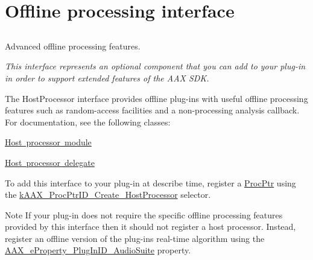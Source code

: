 \hypertarget{a00804}{}\section{Offline processing interface}
\label{a00804}


\subsection{ }
Advanced offline processing features. 

{\itshape This interface represents an optional component that you can add to your plug-\/in in order to support extended features of the A\+AX S\+DK.}

The Host\+Processor interface provides offline plug-\/ins with useful offline processing features such as random-\/access facilities and a non-\/processing analysis callback. For documentation, see the following classes\+:
\begin{DoxyItemize}
\item \mbox{\hyperlink{a01485}{Host processor module}}
\item \mbox{\hyperlink{a01701}{Host processor delegate}}
\end{DoxyItemize}

To add this interface to your plug-\/in at describe time, register a \mbox{\hyperlink{a01813_ad1a286ef7cb869e6f79423dd774ec976}{Proc\+Ptr}} using the \mbox{\hyperlink{a00401_af0682195d377392ad356fd2b00c36892a04ce687ba05b8c7c2cce0b32d868f3db}{k\+A\+A\+X\+\_\+\+Proc\+Ptr\+I\+D\+\_\+\+Create\+\_\+\+Host\+Processor}} selector.

\begin{DoxyNote}{Note}
If your plug-\/in does not require the specific offline processing features provided by this interface then it should not register a host processor. Instead, register an offline version of the plug-\/in\textquotesingle{}s real-\/time algorithm using the \mbox{\hyperlink{a00662_a13e384f22825afd3db6d68395b79ce0dad3344696b8298a8b254add3d039ea927}{A\+A\+X\+\_\+e\+Property\+\_\+\+Plug\+In\+I\+D\+\_\+\+Audio\+Suite}} property. 
\end{DoxyNote}
